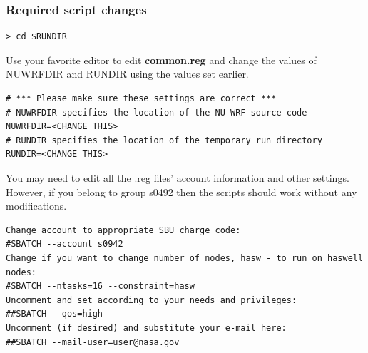 \begin{frame}[fragile]
\frametitle{Required script changes}
\verbatimfont{\scriptsize}%
\begin{verbatim}
> cd $RUNDIR
\end{verbatim}
 Use your favorite editor to edit \textbf{common.reg} and change the values of NUWRFDIR and RUNDIR using the values set earlier.
\verbatimfont{\scriptsize}%
\begin{verbatim}
# *** Please make sure these settings are correct ***
# NUWRFDIR specifies the location of the NU-WRF source code
NUWRFDIR=<CHANGE THIS>
# RUNDIR specifies the location of the temporary run directory
RUNDIR=<CHANGE THIS>
\end{verbatim}
You may need to edit all the .reg files' account information and other settings. However, if you belong to group s0492 then the scripts should work without any modifications.
\verbatimfont{\scriptsize}%
\begin{verbatim}
Change account to appropriate SBU charge code:
#SBATCH --account s0942 
Change if you want to change number of nodes, hasw - to run on haswell nodes:
#SBATCH --ntasks=16 --constraint=hasw
Uncomment and set according to your needs and privileges:
##SBATCH --qos=high 
Uncomment (if desired) and substitute your e-mail here:
##SBATCH --mail-user=user@nasa.gov 
\end{verbatim}

\end{frame}

